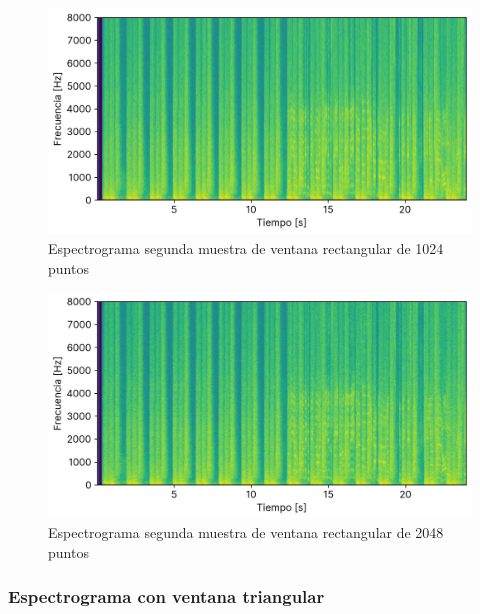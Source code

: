 \documentclass[12pt]{article}
\begin{document}
\begin{figure}[H]
\centering
\includegraphics{plot/cancion2_espectograma_boxcar_1024.png}
\caption{Espectrograma segunda muestra de ventana rectangular de 1024 puntos}
\label{cancion2_espectograma_boxcar_1024}
\end{figure}

\begin{figure}[H]
\centering
\includegraphics{plot/cancion2_espectograma_boxcar_2048.png}
\caption{Espectrograma segunda muestra de ventana rectangular de 2048 puntos}
\label{cancion2_espectograma_boxcar_2048}
\end{figure}

\hypertarget{espectograma-ventana-triangular}{%
\subsubsection{Espectrograma con ventana triangular}\label{espectograma-ventana-triangular}}
\end{document}
